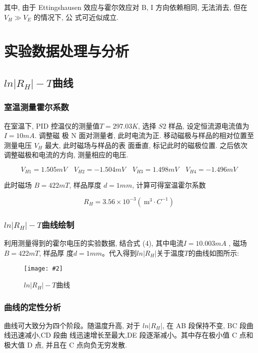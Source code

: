 \documentclass[12pt,a4paper]{article}
\newcommand{\be}[1]{
    \begin{equation}
        #1
    \end{equation}
}
\newcommand{\bfig}[3]{
    \begin{figure}[H]
        \centering
        \texttt{[image: \#2]}
        \caption{#3}
    \end{figure}
}
\begin{document}
其中, 由于 Ettingshausen 效应与霍尔效应对 B, I 方向依赖相同, 无法消去, 但在 $V_H \gg V_E$ 的情况下, 公
式可近似成立.

\section{实验数据处理与分析}
\subsection{$ln|R_H|-T$曲线}
\subsubsection{室温测量霍尔系数}
在室温下, PID 控温仪的测量值$ T = 297.03K$, 选择 $S2$ 样品, 设定恒流源电流值为 $I = 10mA$. 调整磁
极 N 面对测量者, 此时电流为正. 移动磁极与样品的相对位置至测量电压 $V_H$ 最大, 此时磁场与样品的表
面垂直, 标记此时的磁极位置. 之后依次调整磁极和电流的方向, 测量相应的电压. 
\be{V_{H 1}=1.505 m V \quad V_{H 2}=-1.504 m V \quad V_{H 3}=1.498 m V \quad V_{H 4}=-1.496 m V}
此时磁场 $B = 422mT$, 样品厚度 $d = 1mm$, 计算可得室温霍尔系数
\be{R_{H}=3.56 \times 10^{-3}\left(\mathrm{~m}^{3} \cdot C^{-1}\right)}
\subsubsection{$ln|R_H|-T$曲线绘制}
利用测量得到的霍尔电压的实验数据, 结合式 (4), 其中电流$ I = 10.003mA$ , 磁场 $B = 422mT$, 样品厚
度$ d = 1mm$。代入得到$ ln|R_H| $关于温度$ T $的曲线如图所示:
\bfig{0.8}{lgrh-T.png}{$ln|R_H|-T$曲线}
\subsubsection{曲线的定性分析}
曲线可大致分为四个阶段。随温度升高, 对于 $ln |R_H$|, 在 AB 段保持不变, BC 段曲线迅速减小,CD 段曲
线迅速增长至最大,DE 段逐渐减小。其中存在极小值 C 点和极大值 D 点, 并且在 C 点向负无穷发散. 
\end{document}
